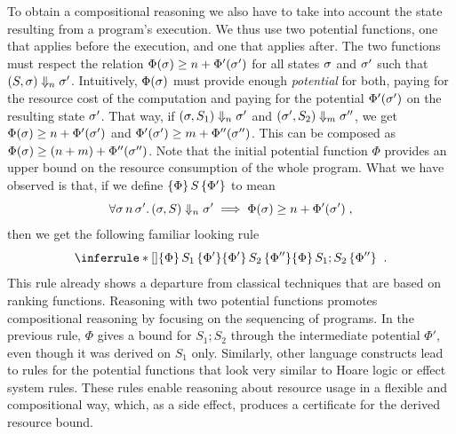 \documentclass[nocopyrightspace,preprint,pldi]{sigplanconf-pldi15}
\begin{document}
To obtain a compositional reasoning we also have to take into account the
state resulting from a program's execution.  We thus use two potential
functions, one that applies before the execution, and one that applies
after.  The two functions must respect the relation $\Phi(\sigma)
\ge n + \Phi'(\sigma')$ for all states $\sigma$ and $\sigma'$ such
that $(S, \sigma) \Downarrow_n \sigma'$.  Intuitively, $\Phi(\sigma)$
must provide enough \emph{potential} for both, paying for the resource
cost of the computation and paying for the potential $\Phi'(\sigma')$ on
the resulting state $\sigma'$. That way, if $(\sigma, S_1) \Downarrow_n
\sigma'$ and $(\sigma', S_2) \Downarrow_m \sigma''$, we get $\Phi(\sigma)
\ge n + \Phi'(\sigma')$ and $\Phi'(\sigma') \ge m + \Phi''(\sigma'')$.
This can be composed as $\Phi(\sigma) \ge (n + m) + \Phi''(\sigma'')$.
Note that the initial potential function $\Phi$ provides an upper bound
on the resource consumption of the whole program.  What we have observed
is that, if we define $\{\Phi\}\, S\, \{\Phi'\}$ to mean
$$
\forall \sigma\, n\, \sigma'.\, (\sigma, S) \Downarrow_n \sigma' \implies \Phi(\sigma) \ge
n + \Phi'(\sigma') \; ,
$$
then we get the following familiar looking rule
$$
\RuleNolabel
{\htriple{\Phi}{S_1}{\Phi'} \\ \htriple{\Phi'}{S_2}{\Phi''}}
{\htriple{\Phi} {S_1; S_2}  {\Phi''}} \;\; .
$$
%
This rule already shows a departure from classical techniques that are
based on ranking functions.  Reasoning with two potential functions
promotes compositional reasoning by focusing on the sequencing of
programs.  In the previous rule, $\Phi$ gives a bound for
$S_1; S_2$ through the intermediate potential $\Phi'$, even though it
was derived on $S_1$ only.
%
Similarly, other language constructs lead to rules for the potential
functions that look very similar to Hoare logic or effect system
rules.  These rules enable reasoning about resource usage
in a flexible and compositional way, which, as a side effect, produces
a certificate for the derived resource bound.



\end{document}
